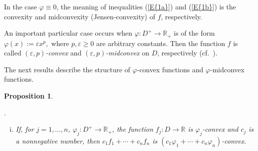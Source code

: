 \documentclass[12pt,leqno]{amsart}
\newtheorem{proposition}[theorem]{Proposition}
\newtheorem*{proposition*}{Proposition}
\theoremstyle{definition}
\begin{document}
In the case $\varphi\equiv0$, the meaning of inequalities {{\rm(\ref{E{1a}})}} and {{\rm(\ref{E{1b}})}} is the convexity
and midconvexity (Jensen-convexity) of $f$, respectively.

An important particular case occurs when $\varphi:D^+\to{\mathbb{R}}_+$ is of the form
$\varphi(x):={\varepsilon} x^p,$ where $p,{\varepsilon}\geq0$ are arbitrary constants.
Then the function $f$ is called \textit{$({\varepsilon},p)$-convex} and
\textit{$({\varepsilon},p)$-midconvex} on $D$, respectively (cf.\ \cite{Pal03a}).

The next results describe the structure of $\varphi$-convex functions and
$\varphi$-midconvex functions.

{
             {\begin{proposition}\label{P{2}}{{\color{white}.}
\begin{enumerate}[(i)]
    \item If, for $j=1,\dots,n$, $\varphi_j:D^+\to{\mathbb{R}}_+$, the function $f_j:D\to {\mathbb{R}}$ is
    $\varphi_j$-convex and $c_j$ is a nonnegative number,
    then $c_1f_1+\cdots+c_nf_n$ is $(c_1\varphi_1+\cdots+c_n\varphi_n)$-convex.

\end{enumerate}}
\end{proposition}}}
\end{document}

